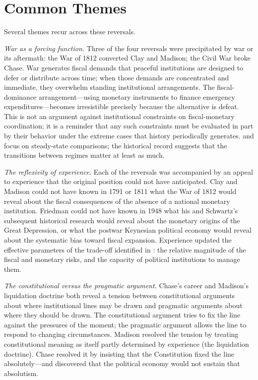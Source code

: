 \documentclass[12pt]{article}
\begin{document}
\section{Common Themes}

Several themes recur across these reversals.

\textit{War as a forcing function.}  Three of the four reversals were
precipitated by war or its aftermath: the War of 1812 converted Clay
and Madison; the Civil War broke Chase.  War generates fiscal demands
that peaceful institutions are designed to defer or distribute across
time; when those demands are concentrated and immediate, they overwhelm
standing institutional arrangements.  The fiscal-dominance
arrangement---using monetary instruments to finance emergency
expenditures---becomes irresistible precisely because the alternative
is defeat.  This is not an argument against institutional constraints on
fiscal-monetary coordination; it is a reminder that any such constraints
must be evaluated in part by their behavior under the extreme cases that
history periodically generates.  \citet{SargentWallace1981} and
\citet{Sargent2011} focus on steady-state comparisons; the historical
record suggests that the transitions between regimes matter at least
as much.

\textit{The reflexivity of experience.}  Each of the reversals was
accompanied by an appeal to experience that the original position could
not have anticipated.  Clay and Madison could not have known in 1791 or
1811 what the War of 1812 would reveal about the fiscal consequences of
the absence of a national monetary institution.  Friedman could not have
known in 1948 what his and Schwartz's subsequent historical research
would reveal about the monetary origins of the Great Depression, or
what the postwar Keynesian political economy would reveal about the
systematic bias toward fiscal expansion.  Experience updated
the effective parameters of the trade-off identified in
\citet{Sargent2011}: the relative magnitude of the fiscal and monetary
risks, and the capacity of political institutions to manage them.

\textit{The constitutional versus the pragmatic argument.}  Chase's
career and Madison's liquidation doctrine both reveal a tension between
constitutional arguments about where institutional lines may be drawn
and pragmatic arguments about where they should be drawn.  The
constitutional argument tries to fix the line against the pressures of
the moment; the pragmatic argument allows the line to respond to
changing circumstances.  Madison resolved the tension by treating
constitutional meaning as itself partly determined by experience
(the liquidation doctrine).  Chase resolved it by insisting that the
Constitution fixed the line absolutely---and discovered that the
political economy would not sustain that absolutism.
\end{document}
